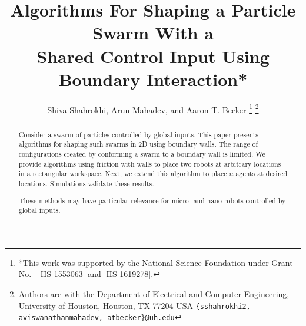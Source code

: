 \documentclass[letterpaper, 10 pt, conference]{ieeeconf}
\title{\LARGE \bf Algorithms For Shaping a Particle Swarm With a\\ Shared Control Input Using Boundary Interaction*}
\author{Shiva Shahrokhi, Arun Mahadev, and Aaron T. Becker%
\thanks{*This work was supported by the National Science Foundation under Grant No.\ \href{http://nsf.gov/awardsearch/showAward?AWD_ID=1553063}{ [IIS-1553063]} and \href{http://nsf.gov/awardsearch/showAward?AWD_ID=1619278}{[IIS-1619278]}.}%
\thanks{Authors are with the Department of Electrical and Computer Engineering,  University of Houston, Houston, TX 77204 USA        {\tt\small  \{sshahrokhi2, aviswanathanmahadev, atbecker\}@uh.edu}}%
}
\begin{document}
\maketitle
\thispagestyle{empty}
\pagestyle{empty}


\begin{abstract}
Consider a swarm of particles controlled by global inputs. 
This paper presents algorithms for shaping such swarms in 2D using boundary walls.
The range of configurations created by conforming a swarm to a boundary wall is limited. 
We provide algorithms using friction with walls to place two robots at arbitrary locations in a rectangular workspace.
Next, we extend this algorithm to place $n$ agents at desired locations. 
Simulations %
validate these results.

These methods may have particular relevance for micro- and nano-robots controlled by global inputs.

 



\end{abstract}

\IEEEpeerreviewmaketitle







{\footnotesize
%
%


}

%
\end{document}
